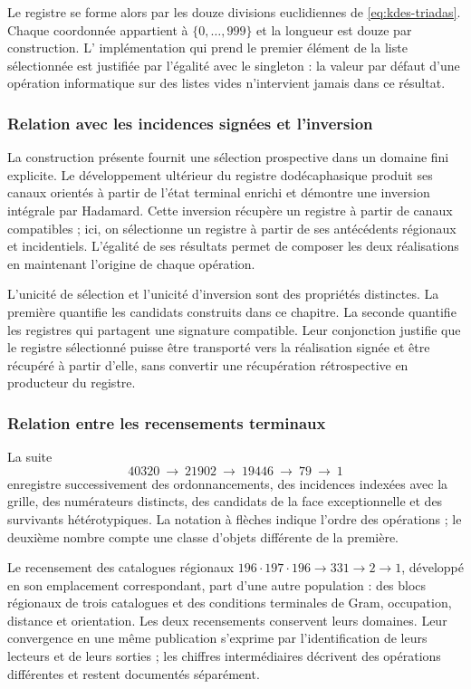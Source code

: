 Le registre se forme alors par les douze divisions euclidiennes de
\eqref{eq:kdes-triadas}. Chaque coordonnée appartient à
$\{0,\ldots,999\}$ et la longueur est douze par construction. L'
implémentation qui prend le premier élément de la liste sélectionnée
est justifiée par l'égalité avec le singleton : la valeur par défaut
d'une opération informatique sur des listes vides n'intervient jamais dans
ce résultat.

\subsubsection{Relation avec les incidences signées et l'inversion}

La construction présente fournit une sélection prospective dans un
domaine fini explicite. Le développement ultérieur du registre
dodécaphasique produit ses canaux orientés à partir de l'état
terminal enrichi et démontre une inversion intégrale par
Hadamard. Cette inversion récupère un registre à partir de canaux
compatibles ; ici, on sélectionne un registre à partir de ses
antécédents régionaux et incidentiels. L'égalité de ses résultats
permet de composer les deux réalisations en maintenant l'origine de chaque
opération.

L'unicité de sélection et l'unicité d'inversion sont des propriétés distinctes. La première quantifie les candidats construits dans ce chapitre. La seconde quantifie les registres qui partagent une signature compatible. Leur conjonction justifie que le registre sélectionné puisse être transporté vers la réalisation signée et être récupéré à partir d'elle, sans convertir une récupération rétrospective en producteur du registre.

\subsubsection{Relation entre les recensements terminaux}

La suite
\[
 40320\ \longrightarrow\ 21902\ \longrightarrow\ 19446
 \ \longrightarrow\ 79\ \longrightarrow\ 1
\]
enregistre successivement des ordonnancements, des incidences indexées avec la grille, des numérateurs distincts, des candidats de la face exceptionnelle et des survivants hétérotypiques. La notation à flèches indique l'ordre des opérations ; le deuxième nombre compte une classe d'objets différente de la première.

Le recensement des catalogues régionaux
$196\cdot197\cdot196\longrightarrow331\longrightarrow2
\longrightarrow1$, développé en son emplacement correspondant, part d'une autre population : des blocs régionaux de trois catalogues et des conditions terminales de Gram, occupation, distance et orientation. Les deux recensements conservent leurs domaines. Leur convergence en une même publication s'exprime par l'identification de leurs lecteurs et de leurs sorties ; les chiffres intermédiaires décrivent des opérations différentes et restent documentés séparément.

